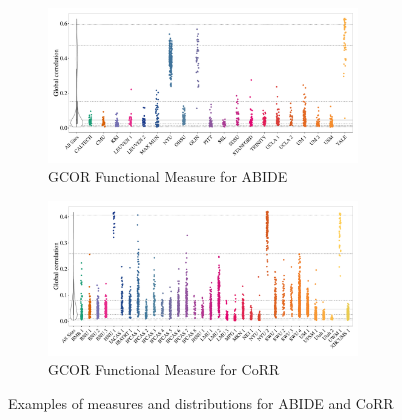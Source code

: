\documentclass{frontiersSCNS} %
\begin{document}
\begin{figure}[!ht]
\begin{subfigure}[b]{0.9\textwidth}
       \includegraphics[width=0.9\textwidth]{fig1_ABIDE_Functional_zgcor}
       \caption{GCOR Functional Measure for ABIDE}
     \end{subfigure}
     \begin{subfigure}[b]{0.9\textwidth}
       \includegraphics[width=0.9\textwidth]{fig1_CORR_Functional_gcor}
       \caption{GCOR Functional Measure for CoRR}
     \end{subfigure} 
     \caption{Examples of measures and distributions for ABIDE and CoRR}
\end{figure}
\end{document}
